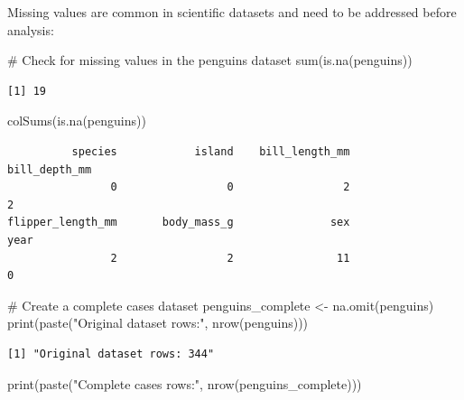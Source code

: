 \documentclass[
  letterpaper,
]{book}
\newenvironment{Shaded}{\begin{snugshade}}{\end{snugshade}}
\newcommand{\CommentTok}[1]{\textcolor[rgb]{0.37,0.37,0.37}{#1}}
\newcommand{\FunctionTok}[1]{\textcolor[rgb]{0.28,0.35,0.67}{#1}}
\newcommand{\NormalTok}[1]{\textcolor[rgb]{0.00,0.23,0.31}{#1}}
\newcommand{\OtherTok}[1]{\textcolor[rgb]{0.00,0.23,0.31}{#1}}
\newcommand{\StringTok}[1]{\textcolor[rgb]{0.13,0.47,0.30}{#1}}
\begin{document}
Missing values are common in scientific datasets and need to be
addressed before analysis:

\begin{Shaded}
\begin{Highlighting}[]
\CommentTok{\# Check for missing values in the penguins dataset}
\FunctionTok{sum}\NormalTok{(}\FunctionTok{is.na}\NormalTok{(penguins))}
\end{Highlighting}
\end{Shaded}

\begin{verbatim}
[1] 19
\end{verbatim}

\begin{Shaded}
\begin{Highlighting}[]
\FunctionTok{colSums}\NormalTok{(}\FunctionTok{is.na}\NormalTok{(penguins))}
\end{Highlighting}
\end{Shaded}

\begin{verbatim}
          species            island    bill_length_mm     bill_depth_mm 
                0                 0                 2                 2 
flipper_length_mm       body_mass_g               sex              year 
                2                 2                11                 0 
\end{verbatim}

\begin{Shaded}
\begin{Highlighting}[]
\CommentTok{\# Create a complete cases dataset}
\NormalTok{penguins\_complete }\OtherTok{\textless{}{-}} \FunctionTok{na.omit}\NormalTok{(penguins)}
\FunctionTok{print}\NormalTok{(}\FunctionTok{paste}\NormalTok{(}\StringTok{"Original dataset rows:"}\NormalTok{, }\FunctionTok{nrow}\NormalTok{(penguins)))}
\end{Highlighting}
\end{Shaded}

\begin{verbatim}
[1] "Original dataset rows: 344"
\end{verbatim}

\begin{Shaded}
\begin{Highlighting}[]
\FunctionTok{print}\NormalTok{(}\FunctionTok{paste}\NormalTok{(}\StringTok{"Complete cases rows:"}\NormalTok{, }\FunctionTok{nrow}\NormalTok{(penguins\_complete)))}
\end{Highlighting}
\end{Shaded}
\end{document}
